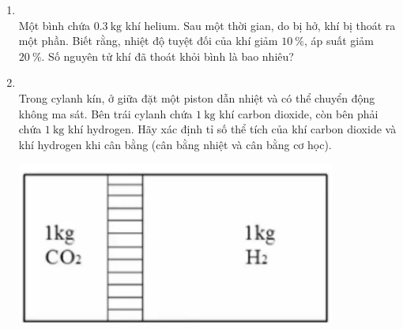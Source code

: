 \begin{enumerate}[label=\bfseries Câu \arabic*:, leftmargin=1.7cm]
\item {}\\
Một bình chứa $\SI{0.3}{\kilogram}$ khí helium. Sau một thời gian, do bị hở, khí bị thoát ra một phần. Biết rằng, nhiệt độ tuyệt đối của khí giảm $\SI{10}{\percent}$, áp suất giảm $\SI{20}{\percent}$. Số nguyên tử khí đã thoát khỏi bình là bao nhiêu?

\item {}\\
Trong cylanh kín, ở giữa đặt một piston dẫn nhiệt và có thể chuyển động không ma sát. Bên trái cylanh chứa $\SI{1}{\kilogram}$ khí carbon dioxide, còn bên phải chứa $\SI{1}{\kilogram}$ khí hydrogen. Hãy xác định tỉ số thể tích của khí carbon dioxide và khí hydrogen khi cân bằng (cân bằng nhiệt và cân bằng cơ học).
\begin{center}
	\includegraphics[width=0.35\linewidth]{../figs/VN12-Y24-PH-SYL-013P-1}
\end{center}


\end{enumerate}
